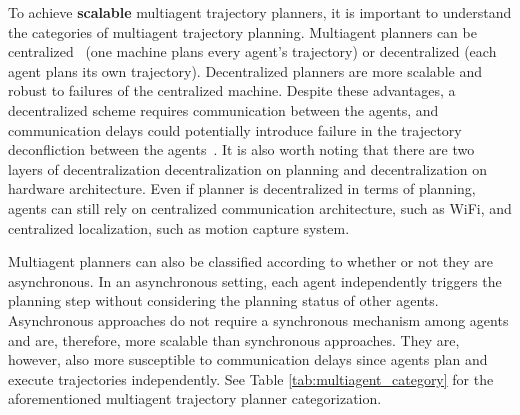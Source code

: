 To achieve \textbf{scalable} multiagent trajectory planners, it is important to understand the categories of multiagent trajectory planning. Multiagent planners can be centralized~\cite{park2020efficient, sharon_conflict-based_2015, robinson2018efficient} (one machine plans every agent's trajectory) or decentralized \cite{tordesillas2020mader, zhou2020ego-swarm, lusk_distributed_2020} (each agent plans its own trajectory).
Decentralized planners are more scalable and robust to failures of the centralized machine. Despite these advantages, a decentralized scheme requires communication between the agents, and communication delays could potentially introduce failure in the trajectory deconfliction between the agents~\cite{gielis_critical_2022}. 
It is also worth noting that there are two layers of decentralization \textemdash decentralization on planning and decentralization on hardware architecture. Even if planner is decentralized in terms of planning, agents can still rely on centralized communication architecture, such as WiFi, and centralized localization, such as motion capture system. 

Multiagent planners can also be classified according to whether or not they are asynchronous. In an asynchronous setting, each agent independently triggers the planning step without considering the planning status of other agents. 
Asynchronous approaches do not require a synchronous mechanism among agents and are, therefore, more scalable than synchronous approaches.
They are, however, also more susceptible to communication delays since agents plan and execute trajectories independently. See Table \ref{tab:multiagent_category} for the aforementioned multiagent trajectory planner categorization.

